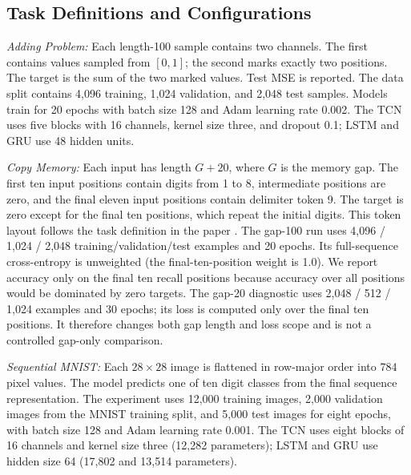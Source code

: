 \documentclass[conference]{IEEEtran}
\begin{document}
\subsection{Task Definitions and Configurations}
\textit{Adding Problem:} Each length-100 sample contains two channels. The first contains values sampled from $[0,1]$; the second marks exactly two positions. The target is the sum of the two marked values. Test MSE is reported. The data split contains 4,096 training, 1,024 validation, and 2,048 test samples. Models train for 20 epochs with batch size 128 and Adam learning rate 0.002. The TCN uses five blocks with 16 channels, kernel size three, and dropout 0.1; LSTM and GRU use 48 hidden units.

\textit{Copy Memory:} Each input has length $G+20$, where $G$ is the memory gap. The first ten input positions contain digits from 1 to 8, intermediate positions are zero, and the final eleven input positions contain delimiter token 9. The target is zero except for the final ten positions, which repeat the initial digits. This token layout follows the task definition in the paper \cite{bai2018}. The gap-100 run uses 4,096 / 1,024 / 2,048 training/validation/test examples and 20 epochs. Its full-sequence cross-entropy is unweighted (the final-ten-position weight is 1.0). We report accuracy only on the final ten recall positions because accuracy over all positions would be dominated by zero targets. The gap-20 diagnostic uses 2,048 / 512 / 1,024 examples and 30 epochs; its loss is computed only over the final ten positions. It therefore changes both gap length and loss scope and is not a controlled gap-only comparison.

\textit{Sequential MNIST:} Each $28\times28$ image is flattened in row-major order into 784 pixel values. The model predicts one of ten digit classes from the final sequence representation. The experiment uses 12,000 training images, 2,000 validation images from the MNIST training split, and 5,000 test images for eight epochs, with batch size 128 and Adam learning rate 0.001. The TCN uses eight blocks of 16 channels and kernel size three (12,282 parameters); LSTM and GRU use hidden size 64 (17,802 and 13,514 parameters).
\end{document}
